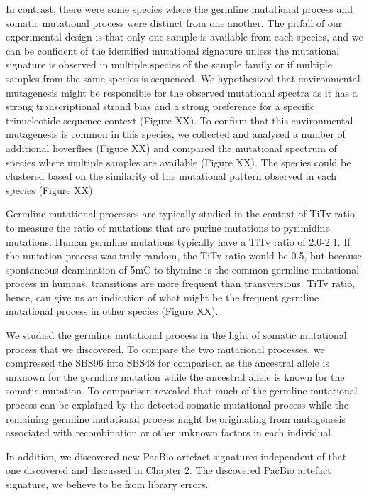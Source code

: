 In contrast, there were some species where the germline mutational process and somatic mutational process were distinct from one another. The pitfall of our experimental design is that only one sample is available from each species, and we can be confident of the identified mutational signature unless the mutational signature is observed in multiple species of the sample family or if multiple samples from the same species is sequenced. We hypothesized that environmental mutagenesis might be responsible for the observed mutational spectra as it has a strong transcriptional strand bias and a strong preference for a specific trinucleotide sequence context (Figure XX). To confirm that this environmental mutagenesis is common in this species, we collected and analysed a number of additional hoverflies (Figure XX) and compared the mutational spectrum of species where multiple samples are available (Figure XX). The species could be clustered based on the similarity of the mutational pattern observed in each species (Figure XX).

Germline mutational processes are typically studied in the context of TiTv ratio to measure the ratio of mutations that are purine mutations to pyrimidine mutations. Human germline mutations typically have a TiTv ratio of 2.0-2.1. If the mutation process was truly random, the TiTv ratio would be 0.5, but because spontaneous deamination of 5mC to thymine is the common germline mutational process in humans, transitions are more frequent than transversions. TiTv ratio, hence, can give us an indication of what might be the frequent germline mutational process in other species (Figure XX).

We studied the germline mutational process in the light of somatic mutational process that we discovered. To compare the two mutational processes, we compressed the SBS96 into SBS48 for comparison as the ancestral allele is unknown for the germline mutation while the ancestral allele is known for the somatic mutation. To comparison revealed that much of the germline mutational process can be explained by the detected somatic mutational process while the remaining germline mutational process might be originating from mutagenesis associated with recombination or other unknown factors in each individual. 

In addition, we discovered new PacBio artefact signatures independent of that one discovered and discussed in Chapter 2. The discovered PacBio artefact signature, we believe to be from library errors. 

